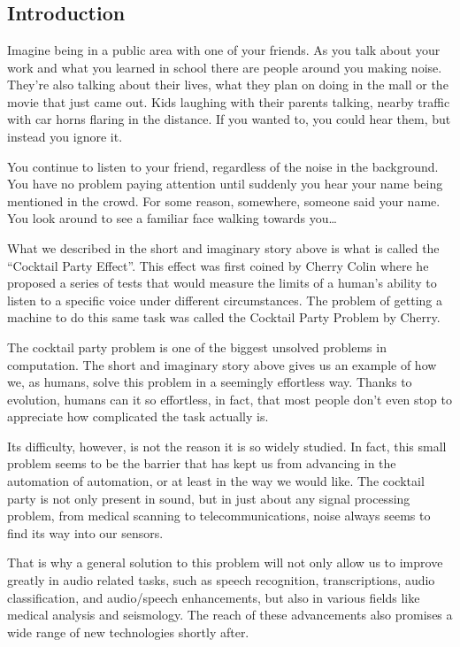 \documentclass{book}
\begin{document}
\chapter{}
\section{Introduction}

\qquad Imagine being in a public area with one of your friends. As you talk about your work and what you learned in school there are people around you making noise. They’re also talking about their lives, what they plan on doing in the mall or the movie that just came out. Kids laughing with their parents talking, nearby traffic with car horns flaring in the distance. If you wanted to, you could hear them, but instead you ignore it.
\par
You continue to listen to your friend, regardless of the noise in the background. You have no problem paying attention until suddenly you hear your name being mentioned in the crowd. For some reason, somewhere, someone said your name. You look around to see a familiar face walking towards you…
\par
What we described in the short and imaginary story above is what is called the “Cocktail Party Effect”. This effect was first coined by Cherry Colin\cite{Cherry} where he proposed a series of tests that would measure the limits of a human’s ability to listen to a specific voice under different circumstances. The problem of getting a machine to do this same task was called the Cocktail Party Problem by Cherry.
\par
The cocktail party problem is one of the biggest unsolved problems in computation. The short and imaginary story above gives us an example of how we, as humans, solve this problem in a seemingly effortless way. Thanks to evolution, humans can it so effortless, in fact, that most people don’t even stop to appreciate how complicated the task actually is.
\par
Its difficulty, however, is not the reason it is so widely studied. In fact, this small problem seems to be the barrier that has kept us from advancing in the automation of automation, or at least in the way we would like. The cocktail party is not only present in sound, but in just about any signal processing problem, from medical scanning to telecommunications\cite{CocktailPartyProblemRevisit}, noise always seems to find its way into our sensors.
\par
That is why a general solution to this problem will not only allow us to improve greatly in audio related tasks, such as speech recognition, transcriptions, audio classification, and audio/speech enhancements, but also in various fields like medical analysis and seismology. The reach of these advancements also promises a wide range of new technologies shortly after.
\end{document}
